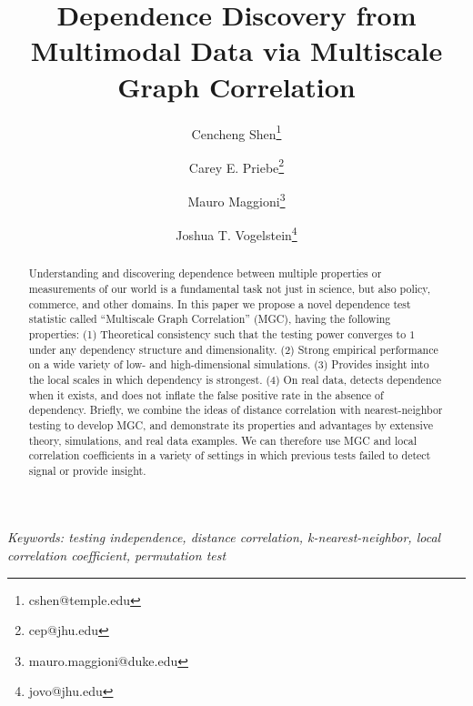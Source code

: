 \documentclass[11pt]{article}
\begin{document}
\def\spacingset#1{\renewcommand{\baselinestretch}%
{#1}\small\normalsize} \spacingset{1}

\title{\bf Dependence Discovery from Multimodal Data via  Multiscale Graph Correlation}
\author[1]{Cencheng Shen\thanks{cshen@temple.edu}}
\author[2]{Carey E. Priebe\thanks{cep@jhu.edu}}
\author[3]{Mauro Maggioni\thanks{mauro.maggioni@duke.edu}}
\author[4]{Joshua T. Vogelstein\thanks{jovo@jhu.edu}}
\maketitle
\pagestyle{empty}

\bigskip
\begin{abstract}
Understanding and discovering dependence between multiple properties or measurements of our world is a fundamental task not just in science, but also policy, commerce, and other domains. 
In this paper we propose a novel dependence test statistic called ``Multiscale Graph Correlation'' (MGC), having the following properties: (1) Theoretical consistency such that the testing power converges to $1$ under any dependency structure and dimensionality. 
(2) Strong empirical performance on a wide variety of low- and high-dimensional simulations. (3) Provides insight into the local scales in which dependency is strongest. (4) On real data, detects dependence when it exists, and does not inflate the false positive rate in the absence of dependency. 
Briefly, we combine the ideas of distance correlation with nearest-neighbor testing to develop MGC, and demonstrate its properties and advantages by extensive theory, simulations, and real data examples. We can therefore use MGC and local correlation coefficients in a variety of settings in which previous tests failed to detect signal or provide insight.
\end{abstract}

\noindent%
{\it Keywords: testing independence, distance correlation, k-nearest-neighbor, local correlation coefficient, permutation test}
\vfill
\end{document}
